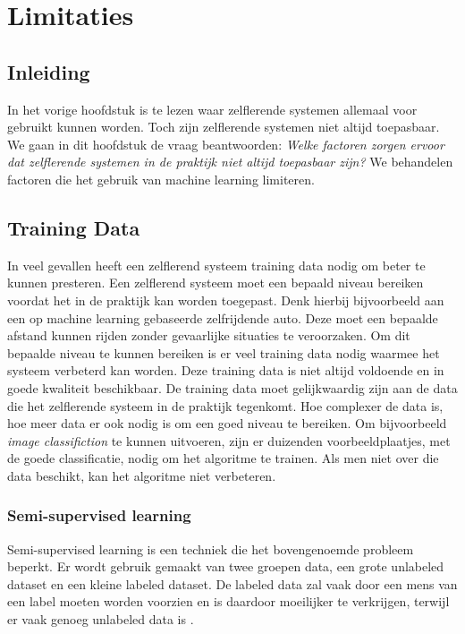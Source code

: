 \section{Limitaties}

\subsection{Inleiding}
In het vorige hoofdstuk is te lezen waar zelflerende systemen allemaal voor gebruikt kunnen worden. Toch zijn zelflerende systemen niet altijd toepasbaar. We gaan in dit hoofdstuk de vraag beantwoorden: \textit{Welke factoren zorgen ervoor dat zelflerende systemen in de praktijk niet altijd toepasbaar zijn?} We behandelen factoren die het gebruik van machine learning limiteren. 

\subsection{Training Data}
In  veel gevallen heeft een zelflerend systeem training data nodig om beter te kunnen presteren. Een zelflerend systeem moet een bepaald niveau bereiken voordat het in de praktijk kan worden toegepast. Denk hierbij bijvoorbeeld aan een op machine learning gebaseerde zelfrijdende auto. Deze moet een bepaalde afstand kunnen rijden zonder gevaarlijke situaties te veroorzaken. Om dit bepaalde niveau te kunnen bereiken is er veel training data nodig waarmee het systeem verbeterd kan worden. Deze training data is niet altijd voldoende en in goede kwaliteit beschikbaar. De training data moet gelijkwaardig zijn aan de data die het zelflerende systeem in de praktijk tegenkomt. Hoe complexer de data is, hoe meer data er ook nodig is om een goed niveau te bereiken. Om bijvoorbeeld \textit{image classifiction} te kunnen uitvoeren, zijn er duizenden voorbeeldplaatjes, met de goede classificatie, nodig om het algoritme te trainen. Als men niet over die data beschikt, kan het algoritme niet verbeteren. 

\subsubsection{Semi-supervised learning}
Semi-supervised learning is een techniek die het bovengenoemde probleem beperkt. Er wordt gebruik gemaakt van twee groepen data, een grote unlabeled dataset en een kleine labeled dataset. De labeled data zal vaak door een mens van een label moeten worden voorzien en is daardoor moeilijker te verkrijgen, terwijl er vaak genoeg unlabeled data is \cite{SemiSupervisedLearning}.

